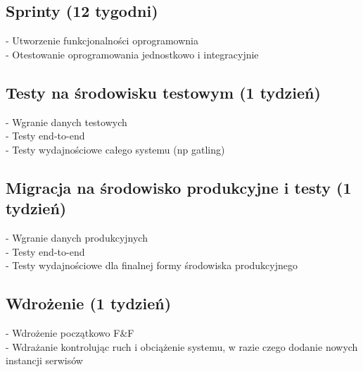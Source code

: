 \documentclass{article}
\begin{document}
    \subsection{Sprinty (12 tygodni)}
      - Utworzenie funkcjonalności oprogramownia \\
      - Otestowanie oprogramowania jednostkowo i integracyjnie

    \subsection{Testy na środowisku testowym (1 tydzień)}
      - Wgranie danych testowych \\
      - Testy end-to-end \\
      - Testy wydajnościowe całego systemu (np gatling)

    \subsection{Migracja na środowisko produkcyjne i testy (1 tydzień)}
      - Wgranie danych produkcyjnych \\
      - Testy end-to-end \\
      - Testy wydajnościowe dla finalnej formy środowiska produkcyjnego

    \subsection{Wdrożenie (1 tydzień)}
      - Wdrożenie początkowo F\&F \\
      - Wdrażanie kontrolując ruch i obciążenie systemu, w razie czego dodanie nowych instancji serwisów
\end{document}
